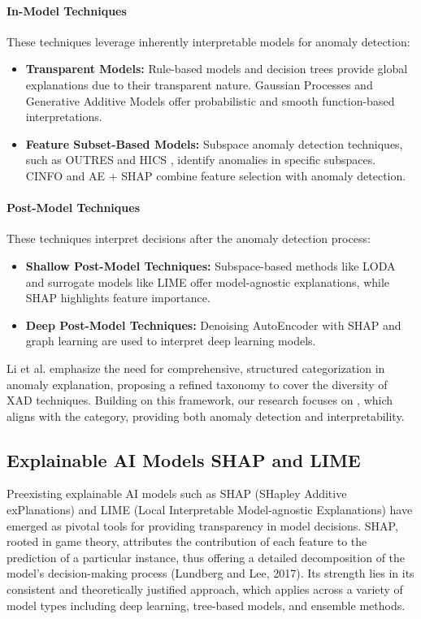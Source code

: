 \paragraph{In-Model Techniques}
These techniques leverage inherently interpretable models for anomaly detection:
\begin{itemize}
    \item \textbf{Transparent Models:} Rule-based models \cite{83,230} and decision trees \cite{108,4,51} provide global explanations due to their transparent nature. Gaussian Processes \cite{21} and Generative Additive Models \cite{38} offer probabilistic and smooth function-based interpretations.
    \item \textbf{Feature Subset-Based Models:} Subspace anomaly detection techniques, such as OUTRES \cite{149} and HICS \cite{99}, identify anomalies in specific subspaces. CINFO \cite{157} and AE + SHAP \cite{178} combine feature selection with anomaly detection.
\end{itemize}

\paragraph{Post-Model Techniques}
These techniques interpret decisions after the anomaly detection process:
\begin{itemize}
    \item \textbf{Shallow Post-Model Techniques:} Subspace-based methods like LODA \cite{169} and surrogate models like LIME \cite{174} offer model-agnostic explanations, while SHAP \cite{128} highlights feature importance.
    \item \textbf{Deep Post-Model Techniques:} Denoising AutoEncoder with SHAP \cite{219} and graph learning \cite{116} are used to interpret deep learning models.
\end{itemize}

Li et al. \cite{10} emphasize the need for comprehensive, structured categorization in anomaly explanation, proposing a refined taxonomy to cover the diversity of XAD techniques. Building on this framework, our research focuses on , which aligns with the  category, providing both anomaly detection and interpretability.

\subsection{Explainable AI Models SHAP and LIME}
Preexisting explainable AI models such as SHAP (SHapley Additive exPlanations) and LIME (Local Interpretable Model-agnostic Explanations) have emerged as pivotal tools for providing transparency in model decisions. SHAP, rooted in game theory, attributes the contribution of each feature to the prediction of a particular instance, thus offering a detailed decomposition of the model's decision-making process (Lundberg and Lee, 2017). Its strength lies in its consistent and theoretically justified approach, which applies across a variety of model types including deep learning, tree-based models, and ensemble methods.

